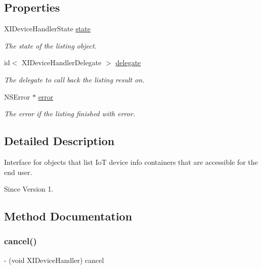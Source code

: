 \subsection*{Properties}
\begin{DoxyCompactItemize}
\item 
X\+I\+Device\+Handler\+State \hyperlink{protocol_x_i_device_handler_01-p_a9dcd7f0b3c074a7d3b0e7d63fc044fdb}{state}
\begin{DoxyCompactList}\small\item\em The state of the listing object. \end{DoxyCompactList}\item 
id$<$ X\+I\+Device\+Handler\+Delegate $>$ \hyperlink{protocol_x_i_device_handler_01-p_a09843895faf6f80b9da3688fcfc06feb}{delegate}
\begin{DoxyCompactList}\small\item\em The delegate to call back the listing result on. \end{DoxyCompactList}\item 
N\+S\+Error $\ast$ \hyperlink{protocol_x_i_device_handler_01-p_af962d7c523a442dfcb6cca4c0ac5672b}{error}
\begin{DoxyCompactList}\small\item\em The error if the listing finished with error. \end{DoxyCompactList}\end{DoxyCompactItemize}


\subsection{Detailed Description}
Interface for objects that list IoT device info containers that are accessible for the end user. 

\begin{DoxySince}{Since}
Version 1. 
\end{DoxySince}


\subsection{Method Documentation}
\hypertarget{protocol_x_i_device_handler_01-p_ae7df43032c98224e1a8213f0066cfc3d}{}\label{protocol_x_i_device_handler_01-p_ae7df43032c98224e1a8213f0066cfc3d} 
\subsubsection{\texorpdfstring{cancel()}{cancel()}}
{\footnotesize\ttfamily -\/ (void X\+I\+Device\+Handler) cancel \begin{DoxyParamCaption}{ }\end{DoxyParamCaption}}



